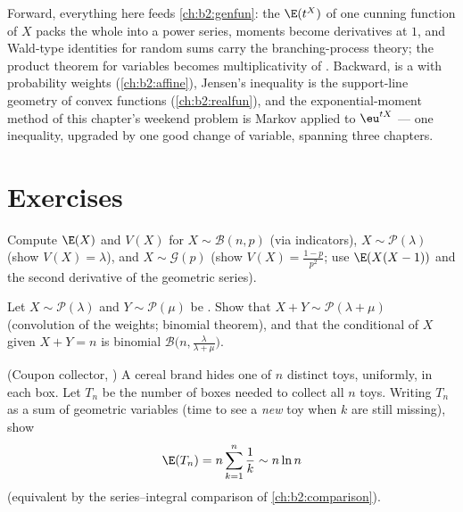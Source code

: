 \begin{remark}
Forward, everything here feeds \cref{ch:b2:genfun}: the
 $\E(t^X)$ of one cunning function of $X$ packs
the whole  into a power series, moments become
derivatives at $1$, and Wald-type identities for random sums
carry the branching-process theory; the product theorem for
 variables becomes multiplicativity of . Backward,  is a  with
probability weights (\cref{ch:b2:affine}), Jensen's
inequality is the support-line geometry of convex functions
(\cref{ch:b2:realfun}), and the exponential-moment method of
this chapter's weekend problem is Markov applied to
$\eu^{tX}$ --- one inequality, upgraded by one good change
of variable, spanning three chapters.
\end{remark}

\section{Exercises}

\begin{exercise}[$\star$]\label{exo:b2:randomvar:1}
Compute $\E(X)$ and $V(X)$ for $X \sim \mathcal{B}(n, p)$ (via
indicators), $X \sim \mathcal{P}(\lambda)$ (show $V(X) =
\lambda$), and $X \sim \mathcal{G}(p)$ (show $V(X) =
\frac{1-p}{p^2}$; use $\E(X(X-1))$ and the second derivative of
the geometric series).
\end{exercise}

\begin{exercise}[$\star$]\label{exo:b2:randomvar:2}
Let $X \sim \mathcal{P}(\lambda)$ and $Y \sim \mathcal{P}(\mu)$ be
. Show that $X + Y \sim \mathcal{P}(\lambda + \mu)$
(convolution of the weights; binomial theorem), and that the
conditional  of $X$ given $X + Y = n$ is binomial
$\mathcal{B}\bigl(n, \frac{\lambda}{\lambda + \mu}\bigr)$.
\end{exercise}

\begin{exercise}[$\star$]\label{exo:b2:randomvar:3}
(Coupon collector, ) A cereal brand hides one of $n$
distinct toys, uniformly, in each box. Let $T_n$ be the number of
boxes needed to collect all $n$ toys. Writing $T_n$ as a sum of
 geometric variables (time to see a \emph{new} toy when
$k$ are still missing), show
\[
\E(T_n) = n\sum_{k=1}^{n}\frac{1}{k} \sim n\ln n
\]
(equivalent by the series--integral comparison of
\cref{ch:b2:comparison}).
\end{exercise}

